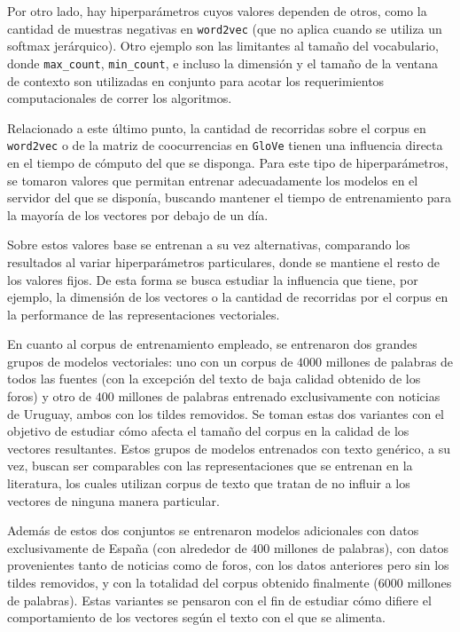 Por otro lado, hay hiperparámetros cuyos valores dependen de otros, como la cantidad de muestras
negativas en \texttt{word2vec} (que no aplica cuando se utiliza un softmax jerárquico). Otro ejemplo
son las limitantes al tamaño del vocabulario, donde \texttt{max\_count}, \texttt{min\_count}, e
incluso la dimensión y el tamaño de la ventana de contexto son utilizadas en conjunto para acotar
los requerimientos computacionales de correr los algoritmos.

Relacionado a este último punto, la cantidad de recorridas sobre el corpus en \texttt{word2vec} o de
la matriz de coocurrencias en \texttt{GloVe} tienen una influencia directa en el tiempo de cómputo
del que se disponga. Para este tipo de hiperparámetros, se tomaron valores que permitan entrenar
adecuadamente los modelos en el servidor del que se disponía, buscando mantener el tiempo de
entrenamiento para la mayoría de los vectores por debajo de un día.

Sobre estos valores base se entrenan a su vez alternativas, comparando los resultados al variar
hiperparámetros particulares, donde se mantiene el resto de los valores fijos. De esta forma se
busca estudiar la influencia que tiene, por ejemplo, la dimensión de los vectores o la cantidad de
recorridas por el corpus en la performance de las representaciones vectoriales.

En cuanto al corpus de entrenamiento empleado, se entrenaron dos grandes grupos de modelos
vectoriales: uno con un corpus de $4000$ millones de palabras de todos las fuentes (con la excepción
del texto de baja calidad obtenido de los foros) y otro de $400$ millones de palabras entrenado
exclusivamente con noticias de Uruguay, ambos con los tildes removidos. Se toman estas dos variantes
con el objetivo de estudiar cómo afecta el tamaño del corpus en la calidad de los vectores
resultantes. Estos grupos de modelos entrenados con texto genérico, a su vez, buscan ser comparables
con las representaciones que se entrenan en la literatura, los cuales utilizan corpus de texto que
tratan de no influir a los vectores de ninguna manera particular.

Además de estos dos conjuntos se entrenaron modelos adicionales con datos exclusivamente de España
(con alrededor de $400$ millones de palabras), con datos provenientes tanto de noticias como de
foros, con los datos anteriores pero sin los tildes removidos, y con la totalidad del corpus
obtenido finalmente ($6000$ millones de palabras). Estas variantes se pensaron con el fin de
estudiar cómo difiere el comportamiento de los vectores según el texto con el que se alimenta.

